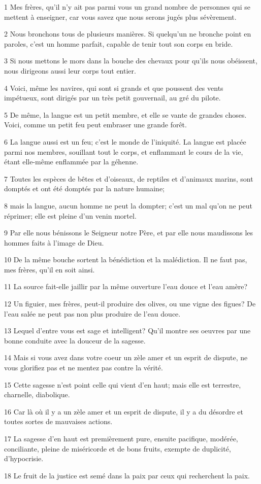 \par 1 Mes frères, qu'il n'y ait pas parmi vous un grand nombre de personnes qui se mettent à enseigner, car vous savez que nous serons jugés plus sévèrement.
\par 2 Nous bronchons tous de plusieurs manières. Si quelqu'un ne bronche point en paroles, c'est un homme parfait, capable de tenir tout son corps en bride.
\par 3 Si nous mettons le mors dans la bouche des chevaux pour qu'ils nous obéissent, nous dirigeons aussi leur corps tout entier.
\par 4 Voici, même les navires, qui sont si grands et que poussent des vents impétueux, sont dirigés par un très petit gouvernail, au gré du pilote.
\par 5 De même, la langue est un petit membre, et elle se vante de grandes choses. Voici, comme un petit feu peut embraser une grande forêt.
\par 6 La langue aussi est un feu; c'est le monde de l'iniquité. La langue est placée parmi nos membres, souillant tout le corps, et enflammant le cours de la vie, étant elle-même enflammée par la géhenne.
\par 7 Toutes les espèces de bêtes et d'oiseaux, de reptiles et d'animaux marins, sont domptés et ont été domptés par la nature humaine;
\par 8 mais la langue, aucun homme ne peut la dompter; c'est un mal qu'on ne peut réprimer; elle est pleine d'un venin mortel.
\par 9 Par elle nous bénissons le Seigneur notre Père, et par elle nous maudissons les hommes faits à l'image de Dieu.
\par 10 De la même bouche sortent la bénédiction et la malédiction. Il ne faut pas, mes frères, qu'il en soit ainsi.
\par 11 La source fait-elle jaillir par la même ouverture l'eau douce et l'eau amère?
\par 12 Un figuier, mes frères, peut-il produire des olives, ou une vigne des figues? De l'eau salée ne peut pas non plus produire de l'eau douce.
\par 13 Lequel d'entre vous est sage et intelligent? Qu'il montre ses oeuvres par une bonne conduite avec la douceur de la sagesse.
\par 14 Mais si vous avez dans votre coeur un zèle amer et un esprit de dispute, ne vous glorifiez pas et ne mentez pas contre la vérité.
\par 15 Cette sagesse n'est point celle qui vient d'en haut; mais elle est terrestre, charnelle, diabolique.
\par 16 Car là où il y a un zèle amer et un esprit de dispute, il y a du désordre et toutes sortes de mauvaises actions.
\par 17 La sagesse d'en haut est premièrement pure, ensuite pacifique, modérée, conciliante, pleine de miséricorde et de bons fruits, exempte de duplicité, d'hypocrisie.
\par 18 Le fruit de la justice est semé dans la paix par ceux qui recherchent la paix.

